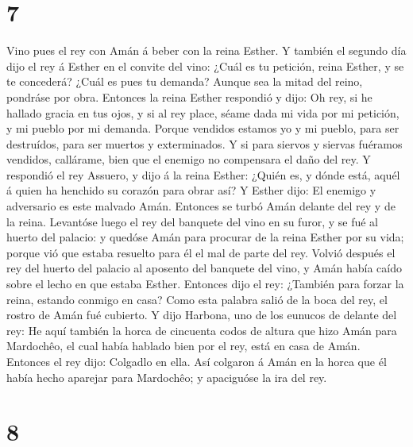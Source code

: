 \hypertarget{section-6}{%
\section{7}\label{section-6}}

 Vino pues el rey con Amán á beber con la reina Esther.
 Y también el segundo día dijo el rey á Esther en el
convite del vino: ¿Cuál es tu petición, reina Esther, y se te concederá?
¿Cuál es pues tu demanda? Aunque sea la mitad del reino, pondráse por
obra.  Entonces la reina Esther respondió y dijo: Oh rey,
si he hallado gracia en tus ojos, y si al rey place, séame dada mi vida
por mi petición, y mi pueblo por mi demanda.  Porque
vendidos estamos yo y mi pueblo, para ser destruídos, para ser muertos y
exterminados. Y si para siervos y siervas fuéramos vendidos, callárame,
bien que el enemigo no compensara el daño del rey.  Y
respondió el rey Assuero, y dijo á la reina Esther: ¿Quién es, y dónde
está, aquél á quien ha henchido su corazón para obrar así?
 Y Esther dijo: El enemigo y adversario es este malvado
Amán. Entonces se turbó Amán delante del rey y de la reina.
 Levantóse luego el rey del banquete del vino en su furor,
y se fué al huerto del palacio: y quedóse Amán para procurar de la reina
Esther por su vida; porque vió que estaba resuelto para él el mal de
parte del rey.  Volvió después el rey del huerto del
palacio al aposento del banquete del vino, y Amán había caído sobre el
lecho en que estaba Esther. Entonces dijo el rey: ¿También para forzar
la reina, estando conmigo en casa? Como esta palabra salió de la boca
del rey, el rostro de Amán fué cubierto.  Y dijo Harbona,
uno de los eunucos de delante del rey: He aquí también la horca de
cincuenta codos de altura que hizo Amán para Mardochêo, el cual había
hablado bien por el rey, está en casa de Amán. Entonces el rey dijo:
Colgadlo en ella.  Así colgaron á Amán en la horca que él
había hecho aparejar para Mardochêo; y apaciguóse la ira del rey.

\hypertarget{section-7}{%
\section{8}\label{section-7}}

